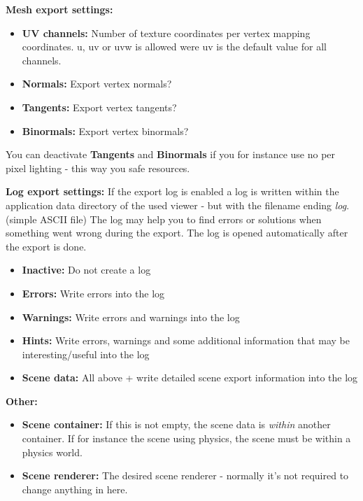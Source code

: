 \textbf{Mesh export settings:}
\begin{itemize}
\item{\textbf{UV channels:} Number of texture coordinates per vertex mapping coordinates. u, uv or uvw is allowed were uv is the default value for all channels.}
\item{\textbf{Normals:} Export vertex normals?}
\item{\textbf{Tangents:} Export vertex tangents?}
\item{\textbf{Binormals:} Export vertex binormals?}
\end{itemize}

You can deactivate \textbf{Tangents} and \textbf{Binormals} if you for instance use no per pixel lighting - this way you safe resources.

\textbf{Log export settings:}
If the export log is enabled a log is written within the application data directory of the used viewer - but with the filename ending \emph{log}. (simple ASCII file) The log may help you to find errors or solutions when something went wrong during the export. The
log is opened automatically after the export is done.
\begin{itemize}
\item{\textbf{Inactive:} Do not create a log}
\item{\textbf{Errors:} Write errors into the log}
\item{\textbf{Warnings:} Write errors and warnings into the log}
\item{\textbf{Hints:} Write errors, warnings and some additional information that may be interesting/useful into the log}
\item{\textbf{Scene data:} All above + write detailed scene export information into the log}
\end{itemize}

\textbf{Other:}
\begin{itemize}
\item{\textbf{Scene container:} If this is not empty, the scene data is \emph{within} another container. If for instance the scene using physics, the scene must be within a physics world.}
\item{\textbf{Scene renderer:} The desired scene renderer - normally it's not required to change anything in here.}
\end{itemize}

